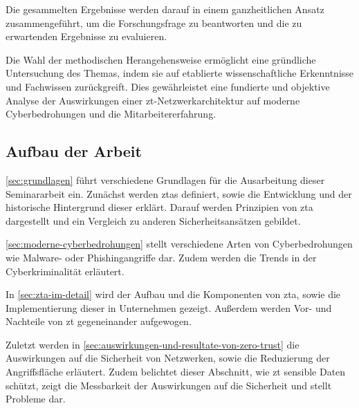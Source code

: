 Die gesammelten Ergebnisse werden darauf in einem ganzheitlichen Ansatz zusammengeführt, um die Forschungsfrage zu beantworten und die zu erwartenden Ergebnisse zu evaluieren.

Die Wahl der methodischen Herangehensweise ermöglicht eine gründliche Untersuchung des Themas, indem sie auf etablierte wissenschaftliche Erkenntnisse und Fachwissen zurückgreift.
Dies gewährleistet eine fundierte und objektive Analyse der Auswirkungen einer \ac{zt}-Netzwerkarchitektur auf moderne Cyberbedrohungen und die Mitarbeitererfahrung.

\subsection{Aufbau der Arbeit}\label{subsec:aufbau-der-arbeit}
\autoref{sec:grundlagen} führt verschiedene Grundlagen für die Ausarbeitung dieser Seminararbeit ein.
Zunächst werden \acp{zta} definiert, sowie die Entwicklung und der historische Hintergrund dieser erklärt.
Darauf werden Prinzipien von \ac{zta} dargestellt und ein Vergleich zu anderen Sicherheitsansätzen gebildet.

\autoref{sec:moderne-cyberbedrohungen} stellt verschiedene Arten von Cyberbedrohungen wie Malware- oder Phishingangriffe dar.
Zudem werden die Trends in der Cyberkriminalität erläutert.

In \autoref{sec:zta-im-detail} wird der Aufbau und die Komponenten von \ac{zta}, sowie die Implementierung dieser in Unternehmen gezeigt.
Außerdem werden Vor- und Nachteile von \ac{zt} gegeneinander aufgewogen.

Zuletzt werden in \autoref{sec:auswirkungen-und-resultate-von-zero-trust} die Auswirkungen auf die Sicherheit von Netzwerken, sowie die Reduzierung der Angriffsfläche erläutert.
Zudem belichtet dieser Abschnitt, wie \ac{zt} sensible Daten schützt, zeigt die Messbarkeit der Auswirkungen auf die Sicherheit und stellt Probleme dar.
